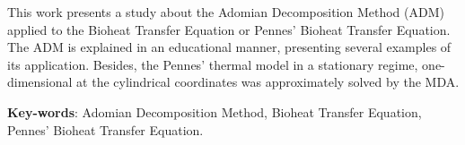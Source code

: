 \begin{resumo}[Abstract]

This work presents a study about the Adomian Decomposition Method (ADM) applied to the Bioheat Transfer Equation or Pennes' Bioheat Transfer Equation. The ADM is explained in an educational manner, presenting several examples of its application. Besides, the Pennes’ thermal model in a stationary regime, one-dimensional at the cylindrical coordinates was approximately solved by the MDA.



 
 
   \textbf{Key-words}:  Adomian Decomposition Method, Bioheat Transfer Equation, Pennes' Bioheat Transfer Equation.

\end{resumo}
